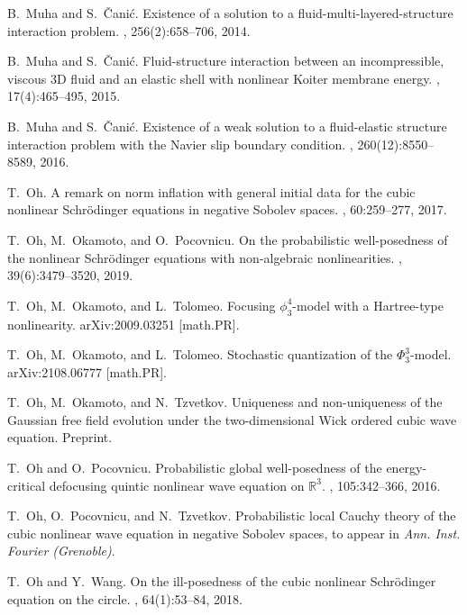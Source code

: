\documentclass[letterpaper, 11pt,  reqno]{amsart}
\newcommand{\1}{\hspace{0.5mm}\text{I}\hspace{0.2mm}}
\numberwithin{equation}{section}
\numberwithin{theorem}{section}
\begin{document}
\begin{thebibliography}{10}
B.~Muha and S.~{\v C}ani\'c.
\newblock Existence of a solution to a fluid-multi-layered-structure
  interaction problem.
, 256(2):658--706, 2014.

B.~Muha and S.~{\v C}ani\'c.
\newblock Fluid-structure interaction between an incompressible, viscous 3{D}
  fluid and an elastic shell with nonlinear {K}oiter membrane energy.
, 17(4):465--495, 2015.

B.~Muha and S.~{\v C}ani\'c.
\newblock Existence of a weak solution to a fluid-elastic structure interaction
  problem with the {N}avier slip boundary condition.
, 260(12):8550--8589, 2016.

T.~Oh.
\newblock A remark on norm inflation with general initial data for the cubic
  nonlinear {S}chr\"{o}dinger equations in negative Sobolev spaces.
, 60:259--277, 2017.

T.~Oh, M.~Okamoto, and O.~Pocovnicu.
\newblock On the probabilistic well-posedness of the nonlinear
  {S}chr\"{o}dinger equations with non-algebraic nonlinearities.
, 39(6):3479--3520, 2019.

T.~Oh, M.~Okamoto, and L.~Tolomeo.
\newblock Focusing $\phi^4_3$-model with a {H}artree-type nonlinearity.
arXiv:2009.03251 [math.PR].


T.~Oh, M.~Okamoto, and L.~Tolomeo.
Stochastic quantization of the $\Phi^3_3$-model.
arXiv:2108.06777 [math.PR].

T.~Oh, M.~Okamoto, and N.~Tzvetkov.
\newblock Uniqueness and non-uniqueness of the {G}aussian free field evolution
  under the two-dimensional {W}ick ordered cubic wave equation.
\newblock Preprint.

T.~Oh and O.~Pocovnicu.
\newblock Probabilistic global well-posedness of the energy-critical defocusing
  quintic nonlinear wave equation on $\mathbb{R}^{3}$.
, 105:342--366, 2016.

T.~Oh, O.~Pocovnicu, and N.~Tzvetkov.
\newblock Probabilistic local {C}auchy theory of the cubic nonlinear wave
  equation in negative {S}obolev spaces,
\newblock to appear in {\em Ann. Inst. Fourier (Grenoble)}.

T.~Oh and Y.~Wang.
\newblock On the ill-posedness of the cubic nonlinear {S}chr\"{o}dinger
  equation on the circle.
,
  64(1):53--84, 2018.


\end{thebibliography}
\end{document}
